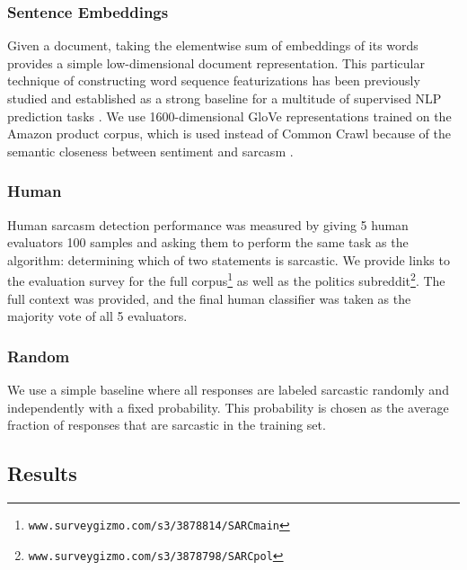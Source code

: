 \documentclass[10pt, a4paper]{article}
\begin{document}
\subsubsection{Sentence Embeddings}
\label{subsec:sif}

Given a document, taking the elementwise sum of embeddings of its words provides a simple low-dimensional document representation. This particular technique of constructing word sequence featurizations has been previously studied and established as a strong baseline for a multitude of supervised NLP prediction tasks \cite{Arora:17}. 
We use 1600-dimensional GloVe representations trained on the Amazon product corpus, which is used instead of Common Crawl because of the semantic closeness between sentiment and sarcasm \cite{McAuley:15}.

\subsubsection{Human}
\label{subsec:human}

Human sarcasm detection performance was measured by giving 5 human evaluators 100 samples and asking them to perform the same task as the algorithm: determining which of two statements is sarcastic. We provide links to the evaluation survey for the full corpus\footnote{\texttt{www.surveygizmo.com/s3/3878814/SARCmain}} as well as the politics subreddit\footnote{\texttt{www.surveygizmo.com/s3/3878798/SARCpol}}.
The full context was provided, and the final human classifier was taken as the majority vote of all 5 evaluators.

\subsubsection{Random}
\label{subsec:random}

We use a simple baseline where all responses are labeled sarcastic randomly and independently with a fixed probability. This probability is chosen as the average fraction of responses that are sarcastic in the training set.

\subsection{Results}
\label{subsec:results}
\end{document}
